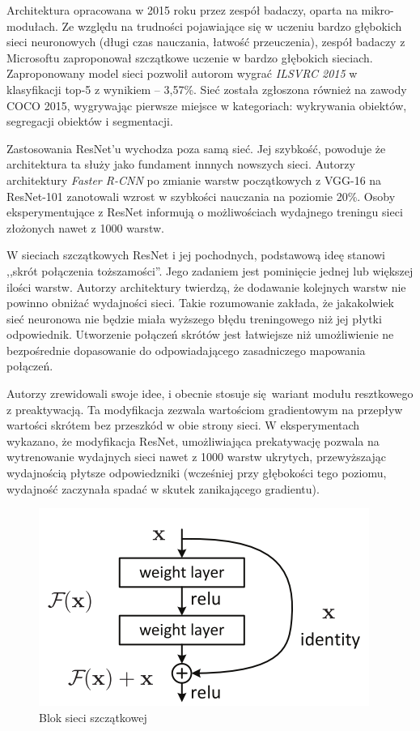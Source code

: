 \documentclass[12pt,a4paper,twoside,titlepage,openright]{book}
\begin{document}
\begin{itemize}
\begin{itemize}
Architektura opracowana w 2015 roku przez zespół badaczy, oparta na mikro-modułach. Ze względu na trudności pojawiające się w uczeniu bardzo głębokich sieci neuronowych (długi czas nauczania, łatwość przeuczenia), zespół badaczy z Microsoftu zaproponował szczątkowe uczenie w bardzo głębokich sieciach. Zaproponowany model sieci pozwolił autorom wygrać \textit{ILSVRC 2015} w klasyfikacji top-5 z wynikiem -- 3,57\%. Sieć została zgłoszona również na zawody COCO 2015, wygrywając pierwsze miejsce w kategoriach: wykrywania obiektów, segregacji obiektów i segmentacji. \cite{DBLP:journals/corr/HeZRS15}

Zastosowania ResNet'u wychodza poza samą sieć. Jej szybkość, powoduje że architektura ta służy jako fundament innnych nowszych sieci. Autorzy architektury \textit{Faster R-CNN} po zmianie warstw początkowych z VGG-16 na ResNet-101 zanotowali wzrost w szybkości nauczania na poziomie 20\%. Osoby eksperymentujące z ResNet informują o możliwościach wydajnego treningu sieci złożonych nawet z 1000 warstw. \cite{siteResnetOverview}

W sieciach szczątkowych ResNet i jej pochodnych, podstawową ideę stanowi ,,skrót połączenia toższamości''. Jego zadaniem jest pominięcie jednej lub większej ilości warstw. Autorzy architektury twierdzą, że dodawanie kolejnych warstw nie powinno obniżać wydajności sieci. Takie rozumowanie zakłada, że jakakolwiek sieć neuronowa nie będzie miała wyższego błędu treningowego niż jej płytki odpowiednik. Utworzenie połączeń skrótów jest łatwiejsze niż umożliwienie ne bezpośrednie dopasowanie do odpowiadającego zasadniczego mapowania połączeń.

Autorzy zrewidowali swoje idee, i obecnie stosuje się wariant modułu resztkowego z preaktywacją. Ta modyfikacja zezwala wartościom gradientowym na przepływ wartości skrótem bez przeszkód w obie strony sieci. W eksperymentach wykazano, że modyfikacja ResNet, umożliwiająca prekatywację pozwala na wytrenowanie wydajnych sieci nawet z 1000 warstw ukrytych, przewyższając wydajnością płytsze odpowiedzniki (wcześniej przy głębokości tego poziomu, wydajność zaczynała spadać w skutek zanikającego gradientu).

\begin{figure}[ht]
	\centering
			\includegraphics[resolution=100, scale=0.4]{residualBlock.png}
		\caption{Blok sieci szczątkowej}
				\label{fig:residualBlock}
\end{figure}



\end{itemize}
\end{itemize}
\end{document}
